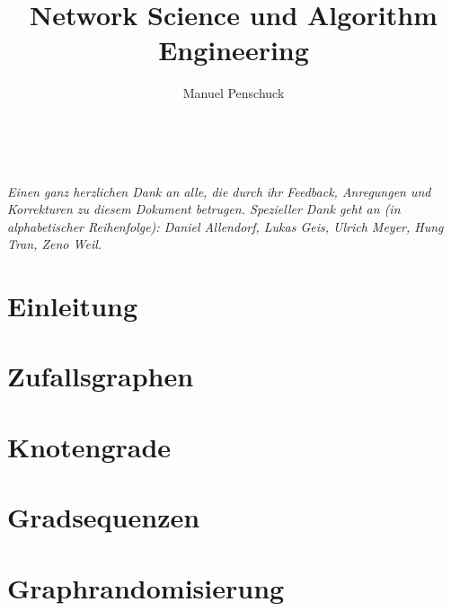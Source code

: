 \documentclass[%
	11pt,%
	ngerman,%
]{book}
\title{Network Science und Algorithm Engineering}
\author{Manuel Penschuck}
\begin{document}
\maketitle

\

\vfill
\vfill
\vfill

\noindent
\textsl{
	Einen ganz herzlichen Dank an alle, die durch ihr Feedback, Anregungen und Korrekturen zu diesem Dokument betrugen.
	Spezieller Dank geht an (in alphabetischer Reihenfolge):
	Daniel Allendorf,
	Lukas Geis,
	Ulrich Meyer,
	Hung Tran,
	Zeno Weil.
}

\vfill

\clearpage

\tableofcontents

\chapter{Einleitung}


\chapter{Zufallsgraphen}


\chapter{Knotengrade}


\chapter{Gradsequenzen}



\chapter{Graphrandomisierung}


\cleardoublepage
{}
\fancyhead[RO]{}
\thispagestyle{fancy}
\pagestyle{fancy}

\small
\patchcmd{\thebibliography}{\chapter*}{\section*}{}{}

\end{document}
